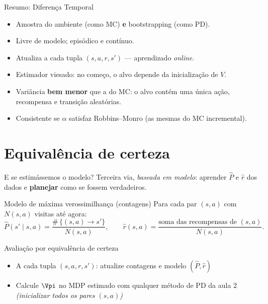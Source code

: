 \documentclass[aspectratio=169, 11pt]{beamer}
\begin{document}
\begin{frame}{Resumo: Diferença Temporal}
  \begin{itemize}
    \item Amostra do ambiente (como MC) \textbf{e} bootstrapping (como PD).
    \item Livre de modelo; episódico e contínuo.
    \item Atualiza a cada tupla $(s, a, r, s')$ — aprendizado \emph{online}.
    \item Estimador \alert{viesado}: no começo, o alvo depende da
      inicialização de $V$.
    \item Variância \textbf{bem menor} que a do MC: o alvo contém uma única
      ação, recompensa e transição aleatórias.
    \item Consistente se $\alpha$ satisfaz Robbins–Monro (as mesmas do MC
      incremental).
  \end{itemize}
\end{frame}

\section{Equivalência de certeza}

\begin{frame}{E se estimássemos o modelo?}
  Terceira via, \emph{baseada em modelo}: aprender $\hat{P}$ e $\hat{r}$
  dos dados e \textbf{planejar} como se fossem verdadeiros.

  \begin{defbox}{Modelo de máxima verossimilhança (contagens)}
    Para cada par $(s,a)$ com $N(s,a)$ visitas até agora:
    \[
      \hat{P}(s' \mid s, a) = \frac{\#\,\{(s,a) \to s'\}}{N(s,a)},
      \qquad
      \hat{r}(s, a) = \frac{\text{soma das recompensas de } (s,a)}{N(s,a)}.
    \]
  \end{defbox}

  \begin{algbox}{Avaliação por equivalência de certeza}
    \begin{itemize}\setlength{\itemsep}{0.2ex}
      \item A cada tupla $(s, a, r, s')$: atualize contagens e modelo
        $(\hat{P}, \hat{r})$
      \item Calcule $\Vpi$ no MDP estimado com qualquer método de PD da
        aula 2 \emph{(inicializar todos os pares $(s,a)$)}
    \end{itemize}
  \end{algbox}
\end{frame}
\end{document}
